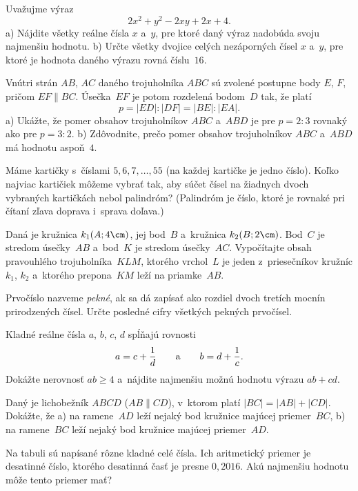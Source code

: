 {%
Uvažujme výraz
$$
2x^2+y^2-2xy+2x+4.
$$
\ite a) Nájdite všetky reálne čísla $x$ a~$y$, pre ktoré daný výraz nadobúda svoju
najmenšiu hodnotu.
\ite b) Určte všetky dvojice celých nezáporných čísel $x$ a~$y$, pre
ktoré je hodnota daného výrazu rovná číslu~$16$.\endgraf
}

{%
Vnútri strán $AB$, $AC$ daného trojuholníka $ABC$ sú zvolené postupne
body $E$, $F$, pričom $EF \parallel BC$. Úsečka~$EF$
je potom rozdelená bodom~$D$ tak, že platí
$$
p = |ED|:|DF| = |BE|:|EA|.
$$
\ite a) Ukážte, že pomer obsahov trojuholníkov $ABC$ a~$ABD$ je pre $p=2:3$ rovnaký
ako pre $p=3:2$.
\ite b) Zdôvodnite, prečo pomer obsahov trojuholníkov $ABC$ a~$ABD$ má hodnotu
aspoň~$4$.\endgraf
}

{%
Máme kartičky s~číslami $5,6,7, \dots, 55$ (na každej kartičke je
jedno číslo). Koľko najviac kartičiek môžeme vybrať tak, aby
súčet čísel na žiadnych dvoch vybraných kartičkách nebol
palindróm? (Palindróm je číslo, ktoré je rovnaké pri čítaní zľava
doprava i~sprava doľava.)
}

{%
Daná je kružnica $k_1 (A; 4\cm)$, jej bod~$B$
a~kružnica $k_2 (B; 2\cm)$. Bod~$C$ je stredom úsečky~$AB$
a~bod~$K$ je stredom úsečky~$AC$. Vypočítajte obsah pravouhlého
trojuholníka~$KLM$, ktorého vrchol~$L$ je jeden z~priesečníkov
kružníc $k_1$, $k_2$ a~ktorého prepona~$KM$ leží na priamke~$AB$.
}

{%
Prvočíslo nazveme {\it pekné}, ak sa dá zapísať ako
rozdiel dvoch tretích mocnín prirodzených čísel. Určte
posledné cifry všetkých pekných prvočísel.}

{%
Kladné reálne čísla $a$, $b$, $c$, $d$ spĺňajú rovnosti
$$
a=c+\frac1d \qquad\text a\qquad b=d+\frac1c .
$$
Dokážte nerovnosť $ab\ge4$ a~nájdite najmenšiu možnú hodnotu výrazu
$ab + cd$.}

{%
Daný je lichobežník $ABCD$ ($AB\parallel CD$), v~ktorom
platí $|BC|=|AB|+|CD|$. Dokážte, že
\ite a) na ramene~$AD$ leží nejaký bod kružnice majúcej priemer~$BC$,
\ite b) na ramene~$BC$ leží nejaký bod kružnice majúcej priemer~$AD$.
}

{%
Na tabuli sú napísané rôzne kladné celé čísla.
Ich aritmetický priemer je desatinné číslo, ktorého desatinná
časť je presne $0{,}2016$. Akú najmenšiu hodnotu môže tento
priemer mať?}


